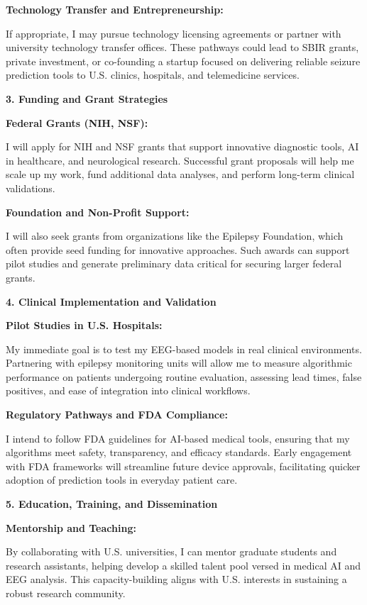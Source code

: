 \documentclass{article}
\begin{document}
{\bf Technology Transfer and Entrepreneurship: } 

If appropriate, I may pursue technology licensing agreements or partner with university technology transfer offices. These pathways could lead to SBIR grants, private investment, or co-founding a startup focused on delivering reliable seizure prediction tools to U.S. clinics, hospitals, and telemedicine services.

{\bf 3. Funding and Grant Strategies }

{\bf Federal Grants (NIH, NSF): }

I will apply for NIH and NSF grants that support innovative diagnostic tools, AI in healthcare, and neurological research. Successful grant proposals will help me scale up my work, fund additional data analyses, and perform long-term clinical validations.

{\bf Foundation and Non-Profit Support: }

I will also seek grants from organizations like the Epilepsy Foundation, which often provide seed funding for innovative approaches. Such awards can support pilot studies and generate preliminary data critical for securing larger federal grants.

{\bf 4. Clinical Implementation and Validation }

{\bf Pilot Studies in U.S. Hospitals: }

My immediate goal is to test my EEG-based models in real clinical environments. Partnering with epilepsy monitoring units will allow me to measure algorithmic performance on patients undergoing routine evaluation, assessing lead times, false positives, and ease of integration into clinical workflows.

{\bf Regulatory Pathways and FDA Compliance: }

I intend to follow FDA guidelines for AI-based medical tools, ensuring that my algorithms meet safety, transparency, and efficacy standards. Early engagement with FDA frameworks will streamline future device approvals, facilitating quicker adoption of prediction tools in everyday patient care.

{\bf 5. Education, Training, and Dissemination }

{\bf Mentorship and Teaching: }

By collaborating with U.S. universities, I can mentor graduate students and research assistants, helping develop a skilled talent pool versed in medical AI and EEG analysis. This capacity-building aligns with U.S. interests in sustaining a robust research community.
\end{document}
